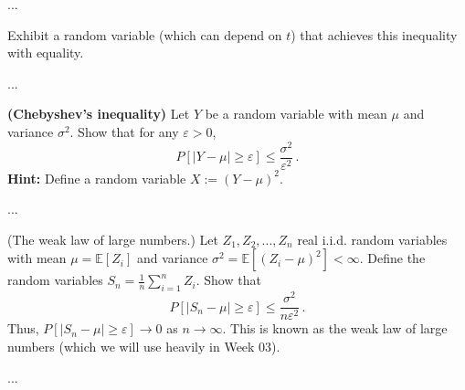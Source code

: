\documentclass[a4paper,10pt]{article}
\begin{document}
\begin{solution}
...
\end{solution}

\begin{subproblem}{1}
	Exhibit a random variable (which can depend on $t$) that achieves this inequality with equality.
\end{subproblem}

\begin{solution}
...
\end{solution}

\begin{subproblem}{3} \textbf{(Chebyshev's inequality)} Let $Y$ be a random variable with mean $\mu$ and variance $\sigma^2$. Show that for any $\varepsilon > 0$,
	\[
	P[|Y - \mu| \geq \varepsilon] \leq \frac{\sigma^2}{\varepsilon^2} \, .
	\]
	\textbf{Hint:} Define a random variable $X := (Y - \mu)^2$.
\end{subproblem}

\begin{solution}
...
\end{solution}

\begin{subproblem}{3} (The weak law of large numbers.) Let $Z_1, Z_2, ..., Z_n$ real i.i.d. random variables with mean $\mu = \mathbb{E}[Z_i]$ and variance $\sigma^2 = \mathbb{E}[(Z_i - \mu)^2] < \infty$. Define the random variables $S_n = \frac{1}{n} \sum_{i=1}^n Z_i$. Show that
	\[
	P[|S_n - \mu | \geq \varepsilon] \leq \frac{\sigma^2}{n\varepsilon^2}\, .
	\]
	Thus, $P[|S_n - \mu| \geq \varepsilon] \to 0$ as $n \to \infty$. This is known as the weak law of large numbers (which we will use heavily in Week 03).
\end{subproblem}

\begin{solution}
...
\end{solution}












\end{document}
